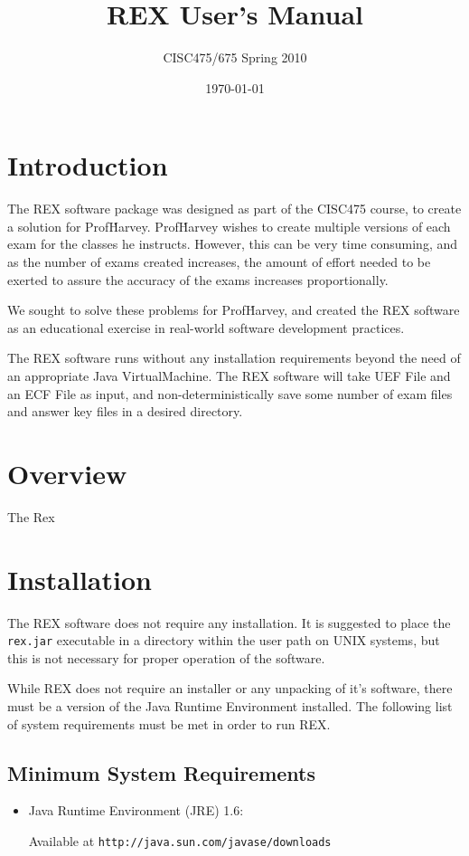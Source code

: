 \documentclass{article}
\author{CISC475/675 Spring 2010}
\title{REX User's Manual}
\date{\today}
\begin{document}
\maketitle
\tableofcontents
\newpage

\section{Introduction}
The REX software package was designed as part of the CISC475 course,
to create a solution for Prof\. Harvey. Prof\. Harvey wishes to create
multiple versions of each exam for the classes he instructs. However,
this can be very time consuming, and as the number of exams created
increases, the amount of effort needed to be exerted to assure the
accuracy of the exams increases proportionally.

We sought to solve these problems for Prof\. Harvey, and created the
REX software as an educational exercise in real-world software
development practices.

The REX software runs without any installation requirements beyond the
need of an appropriate Java VirtualMachine. The REX software will take
UEF File and an ECF File as input, and non-deterministically save
some number of exam files and answer key files in a desired directory.

\section{Overview}
The Rex 

\section{Installation}
The REX software does not require any installation. It is suggested to
place the \texttt{rex.jar} executable in a directory within the user
path on UNIX systems, but this is not necessary for proper operation
of the software.

While REX does not require an installer or any unpacking of it's software,
there must be a version of the Java Runtime Environment installed. The
following list of system requirements must be met in order to run REX.

\subsection{Minimum System Requirements}
\begin{itemize}
\item Java Runtime Environment (JRE) 1.6: 

Available at 
\verb|http://java.sun.com/javase/downloads|
\end{itemize}
\end{document}
